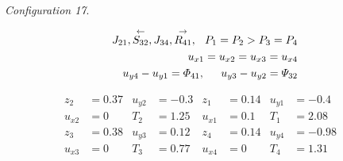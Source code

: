 \documentclass{rsproca}%
\begin{document}
{\em Configuration 17}.

\begin{eqnarray*}
J_{21},\stackrel{\leftarrow}{S_{32}},J_{34},\stackrel{\rightarrow}{R_{41}},\hspace{0.1in}P_1=P_2>P_3=P_4&\\
u_{x1}=u_{x2}=u_{x3}=u_{x4}\\
u_{y4}-u_{y1}=\Phi_{41},\hspace{0.2in}u_{y3}-u_{y2}=\Psi_{32}&
\label{con17setup}
\end{eqnarray*}

\begin{align*} 
z_2		&=0.37& u_{y2}	&=-0.3& z_1		 	&=0.14& 	u_{y1}	&=-0.4& 	\\
u_{x2}&=0& 		T_2			&=1.25& u_{x1}	&=0.1& 		T_1			&=2.08&		\\
z_3		&=0.38& u_{y3}	&=0.12& z_4			&=0.14&		u_{y4}	&=-0.98& 	\\
u_{x3}&=0& 		T_3			&=0.77& u_{x4}	&=0& 			T_4			&=1.31&		\\
\end{align*}
\end{document}
